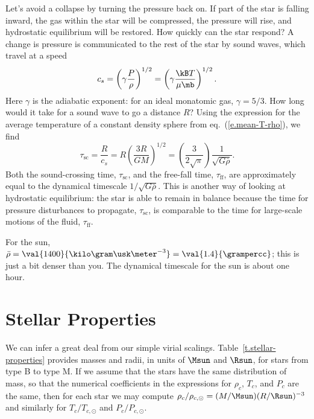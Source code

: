 Let's avoid a collapse by turning the pressure back on.  If part of the star is falling inward, the gas within the star will be compressed, the pressure will rise, and hydrostatic equilibrium will be restored.  How quickly can the star respond? A change is pressure is communicated to the rest of the star by sound waves, which travel at a speed
\begin{equation}\label{e.speed-of-sound}
c_{s} = \left(\gamma\frac{P}{\rho}\right)^{1/2}
	= \left(\gamma\frac{\kB T}{\mu\mb}\right)^{1/2}.
\end{equation}
Here $\gamma$ is the adiabatic exponent: for an ideal monatomic gas, $\gamma = 5/3$.  How long would it take for a sound wave to go a distance $R$?  Using the expression for the average temperature of a constant density sphere from eq.~(\ref{e.mean-T-rho}), we find
\[
	\tau_{\mathrm{sc}} = \frac{R}{c_{s}} = R\left(\frac{3R}{GM}\right)^{1/2}
		= \left(\frac{3}{2\sqrt{\pi}}\right)\frac{1}{\sqrt{G\bar{\rho}}}.
\]
Both the sound-crossing time, $\tau_{\mathrm{sc}}$, and the free-fall time, $\tau_{\mathrm{ff}}$, are approximately equal to the dynamical timescale $1/\sqrt{G\bar{\rho}}$.  This is another way of looking at hydrostatic equilibrium: the star is able to remain in balance because the time for pressure disturbances to propagate, $\tau_{\mathrm{sc}}$, is comparable to the time for large-scale motions of the fluid, $\tau_{\mathrm{ff}}$.

For the sun, $\bar{\rho} = \val{1400}{\kilo\gram\usk\meter^{-3}} = \val{1.4}{\grampercc}$; this is just a bit denser than you.  The dynamical timescale for the sun is about one hour.

\section{Stellar Properties}
\label{s.stellar-properties}

We can infer a great deal from our simple virial scalings. Table~\ref{t.stellar-properties} provides masses and radii, in units of $\Msun$ and $\Rsun$, for stars from type B to type M.  If we assume that the stars have the same distribution of mass, so that the numerical coefficients in the expressions for $\rho_{c}$, $T_{c}$, and $P_{c}$ are the same, then for each star we may compute $\rho_{c}/\rho_{c,\odot} = (M/\Msun)(R/\Rsun)^{-3}$ and similarly for $T_{c}/T_{c,\odot}$ and $P_{c}/P_{c,\odot}$.

